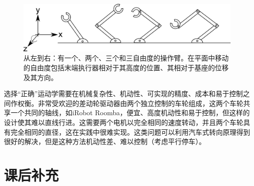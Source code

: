 \begin{figure}
	\centering
		\includegraphics[width=\textwidth]{figs/basickinematics.png}
	\caption{从左到右：有一个、两个、三个和三自由度的操作臂。在平面中移动的自由度包括末端执行器相对于其高度的位置、其相对于基座的位移及其方向。}
	\label{fig:basickinematics}
\end{figure}


选择“正确”运动学需要在机械复杂性、机动性、可实现的精度、成本和易于控制之间作权衡。非常受欢迎的差动轮驱动器由两个独立控制的车轮组成，这两个车轮共享一个共同的轴线，如iRobot Roomba，便宜、高度机动性和易于控制，但这样的设计使其难以直线行进。这需要两个电机以完全相同的速度转动，并且两个车轮具有完全相同的直径，这在实践中很难实现。这类问题可以利用汽车式转向原理得到很好的解决，但是这种方法机动性差、难以控制（考虑平行停车）。

\section*{课后补充}

